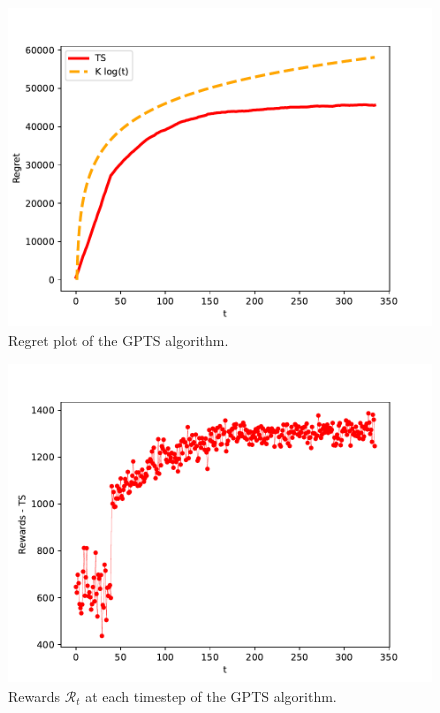 \documentclass[12pt,a4paper]{report}
\begin{document}
\begin{figure}[H]
\centering
  \includegraphics[scale = 0.7, center]{6r}
  \caption{Regret plot of the GPTS algorithm.}
\end{figure}
\begin{figure}[H]
\centering
  \includegraphics[scale = 0.7, center]{6rew}
  \caption{Rewards $\mathcal R_t$ at each timestep of the GPTS algorithm.}
\end{figure}
\end{document}
